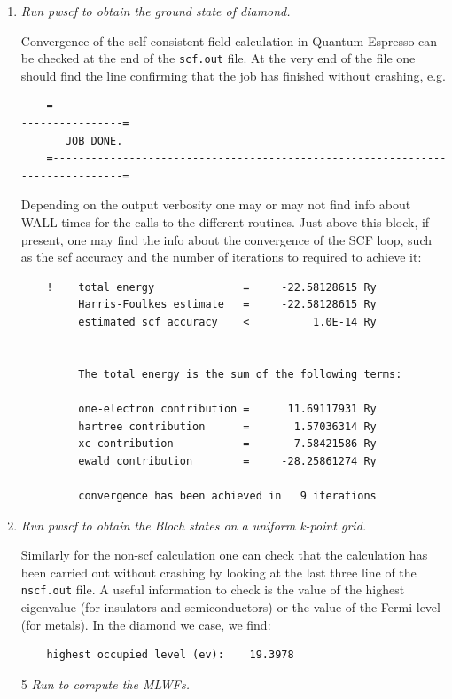 \begin{enumerate}
	\item {\it Run pwscf to obtain the ground state of diamond.}

	Convergence of the self-consistent field calculation in Quantum Espresso can be checked at the end of the {\tt scf.out} file. At the very end of the file one should find the line confirming that the job has finished without crashing, e.g.
	\begin{tcolorbox}[sharp corners,boxrule=0.5pt]
	{\small
	\begin{verbatim}
	=------------------------------------------------------------------------------=
	   JOB DONE.
	=------------------------------------------------------------------------------=
	\end{verbatim}
	}
	\end{tcolorbox}
	Depending on the output verbosity one may or may not find info about WALL times for the calls to the different routines. Just above this block, if present, one may find the info about the convergence of the SCF loop, such as the scf accuracy and the number of iterations to required to achieve it:
	\begin{tcolorbox}[sharp corners,boxrule=0.5pt]
	\small{
	\begin{verbatim}
    !    total energy              =     -22.58128615 Ry
         Harris-Foulkes estimate   =     -22.58128615 Ry
         estimated scf accuracy    <          1.0E-14 Ry


         The total energy is the sum of the following terms:

         one-electron contribution =      11.69117931 Ry
         hartree contribution      =       1.57036314 Ry
         xc contribution           =      -7.58421586 Ry
         ewald contribution        =     -28.25861274 Ry

         convergence has been achieved in   9 iterations
	\end{verbatim}
	}
	\end{tcolorbox}
	\item {\it Run pwscf to obtain the Bloch states on a uniform k-point grid.}

	Similarly for the non-scf calculation one can check that the calculation has been carried out without crashing by looking at the last three line of the {\tt nscf.out} file. A useful information to check is the value of the highest eigenvalue (for insulators and semiconductors) or the value of the Fermi level (for metals). In the diamond we case, we find:
	\begin{tcolorbox}[sharp corners,boxrule=0.5pt]
	{\small
	\begin{verbatim}
	highest occupied level (ev):    19.3978
	\end{verbatim}
	}
	\end{tcolorbox}
	\item[5] {\it Run \Wannier{} to compute the MLWFs.}


\end{enumerate}
